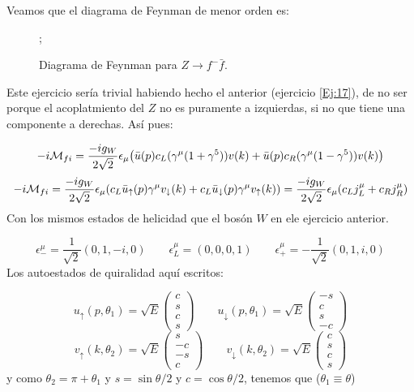 Veamos que el diagrama de Feynman de menor orden es:

\begin{figure}[H]
	\centering
	;
	\caption{Diagrama de Feynman para \(Z \to f^- \bar{f} \).}
\end{figure}


Este ejercicio sería trivial habiendo hecho el anterior (ejercicio \ref{Ej:17}), de no ser porque el acoplatmiento del $Z$ no es puramente a izquierdas, si no que tiene una componente a derechas. Así pues: 

\begin{equation}
	-i\Mcal_{fi} = \frac{-ig_W}{2\sqrt{2}} \epsilon_\mu  \pqty{ \bar{u}(p) c_L(\gamma^\mu  (1+\gamma^5))v(k) + \bar{u}(p) c_R(\gamma^\mu  (1-\gamma^5))v(k)}
\end{equation}
\begin{equation}
	-i\Mcal_{fi} = \frac{-ig_W}{2\sqrt{2}} \epsilon_\mu  \pqty{ c_L \bar{u}_\uparrow(p) \gamma^\mu v_\downarrow(k) + c_L \bar{u}_\downarrow(p) \gamma^\mu v_\uparrow(k)} = \frac{-ig_W}{2\sqrt{2}} \epsilon_\mu (c_L j_L^\mu + c_R j_R^\mu)
\end{equation}
Con los mismos estados de helicidad que el bosón $W$ en ele ejercicio anterior.

\begin{equation}
	\epsilon_- ^\mu = \frac{1}{\sqrt{2}} (0,1,-i,0) \qquad \epsilon_L^\mu = (0,0,0,1) \qquad \epsilon_+^\mu = - \frac{1}{\sqrt{2}} (0,1,i,0)
\end{equation}
Los autoestados de quiralidad aquí escritos: 

\begin{equation} 
	u_\uparrow(p,\theta_1)= \sqrt{E} \begin{pmatrix}
		c \\ s \\ c \\ s
	\end{pmatrix} \qquad 
	u_\downarrow(p,\theta_1)= \sqrt{E} \begin{pmatrix}
		-s \\ c \\ s \\ -c
	\end{pmatrix}
\end{equation}
\begin{equation}
	v_\uparrow(k,\theta_2) = \sqrt{E} \begin{pmatrix}
		s \\ -c \\ -s \\ c
	\end{pmatrix}  \qquad 
	v_\downarrow(k,\theta_2) = \sqrt{E} \begin{pmatrix}
		c \\ s \\ c \\ s
	\end{pmatrix} 
\end{equation}
y como $\theta_2 = \pi + \theta_1$ y $s=\sin \theta/2$ y $c=\cos\theta/2$, tenemos que ($\theta_1 \equiv \theta$)

